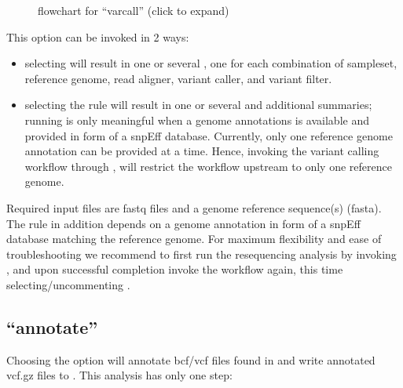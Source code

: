 \documentclass[letterpaper,10pt,english]{sphinxmanual}
\let\sphinxpxdimen\pdfpxdimen\else\newdimen\sphinxpxdimen
\begin{document}
\begin{figure}[htbp]
\centering
\capstart

\noindent\sphinxincludegraphics[height=600\sphinxpxdimen]{{dna-proto-workflow-varcall-11}.png}
\caption{ flowchart for “varcall” (click to expand)}\label{\detokenize{index:id7}}\end{figure}

This option can be invoked in 2 ways:
\begin{itemize}
\item {} 
selecting  will result in one or several , one for each combination of sample\sphinxhyphen{}set, reference genome, read aligner, variant caller, and variant filter.

\item {} 
selecting the rule  will result in one or several  and additional summaries; running   is only meaningful when a genome annotations is available and provided in form of a snpEff database. Currently, only one reference genome annotation can be provided at a time. Hence, invoking the variant calling workflow through , will restrict the  workflow upstream to only one reference genome.

\end{itemize}

Required input files are fastq files and a genome reference sequence(s) (fasta). The rule  in addition depends on a genome annotation in form of a snpEff database matching the reference genome. For maximum flexibility and ease of troubleshooting we recommend to first run the re\sphinxhyphen{}sequencing analysis by invoking , and upon successful completion invoke the workflow again, this time selecting/uncommenting .


\subsection{“annotate”}
\label{\detokenize{index:annotate}}
Choosing the option  will annotate bcf/vcf files found in  and write annotated vcf.gz files to . This analysis has only one step:
\end{document}
